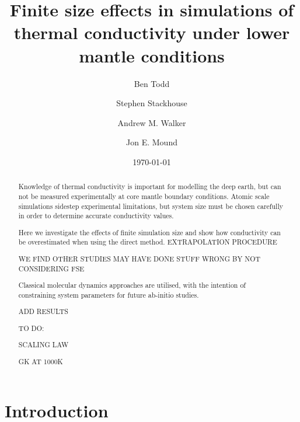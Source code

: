 \documentclass[%
preprint,                                  %
nofootinbib,
 amsmath,amssymb,
 aps,
]{revtex4-1}
\begin{document}
\newcommand{\wmk}{Wm$^{-1}$K$^{-1}$}


\title{Finite size effects in simulations of thermal conductivity under lower mantle conditions}%

\author{Ben Todd}
\author{Stephen Stackhouse}
\author{Andrew M. Walker}
\author{Jon E. Mound}


\date{\today}%

\begin{abstract}

Knowledge of thermal conductivity is important for modelling the deep earth, but can not be measured experimentally at core mantle boundary conditions. Atomic scale simulations sidestep experimental limitations, but system size must be chosen carefully in order to determine accurate conductivity values.

Here we investigate the effects of finite simulation size and show how conductivity can be overestimated when using the direct method. EXTRAPOLATION PROCEDURE

WE FIND OTHER STUDIES MAY HAVE DONE STUFF WRONG BY NOT CONSIDERING FSE

Classical molecular dynamics approaches are utilised, with the intention of constraining system parameters for future ab-initio studies.

ADD RESULTS

TO DO:

SCALING LAW

GK AT 1000K
\end{abstract}

\maketitle




\section{\label{sec:intro}Introduction}
\end{document}
